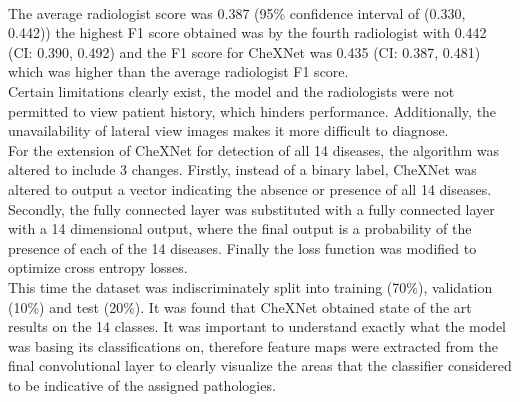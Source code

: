 \\
The average radiologist score was 0.387 (95\% confidence interval of (0.330, 0.442)) the highest F1 score obtained was by the fourth radiologist with 0.442 (CI: 0.390, 0.492) and the F1 score for CheXNet was 0.435 (CI: 0.387, 0.481) which was higher than the average radiologist F1 score.\newline
\\
Certain limitations clearly exist, the model and the radiologists were not permitted to view patient history, which hinders performance. Additionally, the unavailability of lateral view images makes it more difficult to diagnose.\newline
\\
For the extension of CheXNet for detection of all 14 diseases, the algorithm was altered to include 3 changes. Firstly, instead of a binary label, CheXNet was altered to output a vector indicating the absence or presence of all 14 diseases. Secondly, the fully connected layer was substituted with a fully connected layer with a 14 dimensional output, where the final output is a probability of the presence of each of the 14 diseases. Finally the loss function was modified to optimize cross entropy losses.\newline
\\
This time the dataset was indiscriminately split into training (70\%), validation (10\%) and test (20\%). It was found that CheXNet obtained state of the art results on the 14 classes. It was important to understand exactly what the model was basing its classifications on, therefore feature maps were extracted from the final convolutional layer to clearly visualize the areas that the classifier considered to be indicative of the assigned pathologies.
